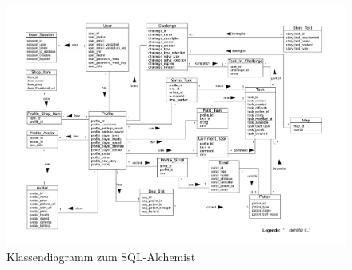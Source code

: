 \begin{figure}[h]
\centering
\includegraphics[width=1.0\textwidth]{figures/KlassenDiagrammTE.pdf}
\caption{Klassendiagramm zum SQL-Alchemist}
\label{datenmodell}
\end{figure}
\newpage
\newpage

